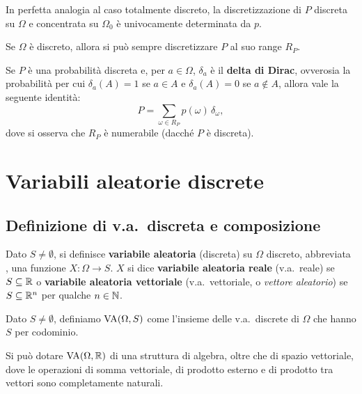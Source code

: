 \begin{multicols*}{2}
\begin{remark}
    In perfetta analogia al caso totalmente discreto, la discretizzazione
    di $P$ discreta su $\Omega$ e concentrata su $\Omega_0$ è univocamente
    determinata da $p$.
\end{remark}

\begin{remark}
    Se $\Omega$ è discreto, allora si può sempre discretizzare
    $P$ al suo range $R_P$.
\end{remark}

\begin{remark}
    \label{remark:identità_discreta_dirac}
    Se $P$ è una probabilità discreta e, per $a \in \Omega$, $\delta_a$ è il \textbf{delta di Dirac}, ovverosia
    la probabilità per cui $\delta_a(A) = 1$ se $a \in A$ e $\delta_a(A) = 0$ se $a \notin A$, allora vale
    la seguente identità:
    \[
        P = \sum_{\omega \in R_P} p(\omega) \, \delta_{\omega},
    \]
    dove si osserva che $R_P$ è numerabile (dacché $P$ è discreta).
\end{remark}

\section{Variabili aleatorie discrete}

\subsection{Definizione di v.a.~discreta e composizione}

\begin{definition}
    Dato $S \neq \emptyset$, si definisce \textbf{variabile
    aleatoria} (discreta) su $\Omega$ discreto, abbreviata \va, una funzione
    $X : \Omega \to S$. $X$ si dice \textbf{variabile aleatoria reale}
    (v.a.~reale) se $S \subseteq \mathbb{R}$ o \textbf{variabile aleatoria vettoriale}
    (v.a.~vettoriale, o \textit{vettore aleatorio}) se $S \subseteq \mathbb{R}^n$ per
    qualche $n \in \mathbb{N}$. \smallskip


    Dato $S \neq \emptyset$, definiamo $\operatorname{VA}(\Omega, S)$ come l'insieme
    delle v.a.~discrete di $\Omega$ che hanno $S$ per codominio.
\end{definition}

\begin{remark}
    Si può dotare $\operatorname{VA}(\Omega, \mathbb{R})$ di una struttura di algebra, oltre che di
    spazio vettoriale, dove le operazioni di somma vettoriale, di prodotto
    esterno e di prodotto tra vettori sono completamente naturali. \medskip



\end{remark}
\end{multicols*}
